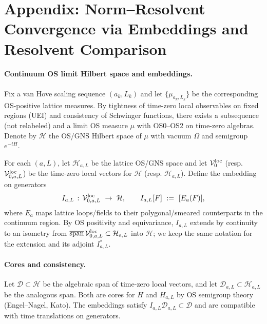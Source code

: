 \documentclass[11pt]{amsart}
\theoremstyle{plain}
\theoremstyle{definition}
\theoremstyle{remark}
\begin{document}
\medskip
\section{Appendix: Norm--Resolvent Convergence via Embeddings and Resolvent Comparison}

\paragraph{Continuum OS limit Hilbert space and embeddings.}
Fix a van Hove scaling sequence $(a_k,L_k)$ and let $\{\mu_{a_k,L_k}\}$ be the corresponding OS-positive lattice measures. By tightness of time-zero local observables on fixed regions (UEI) and consistency of Schwinger functions, there exists a subsequence (not relabeled) and a limit OS measure $\mu$ with OS0--OS2 on time-zero algebras. Denote by $\mathcal H$ the OS/GNS Hilbert space of $\mu$ with vacuum $\Omega$ and semigroup $e^{-tH}$.

For each $(a,L)$, let $\mathcal H_{a,L}$ be the lattice OS/GNS space and let $\mathcal V^{\rm loc}_0$ (resp. $\mathcal V^{\rm loc}_{0,a,L}$) be the time-zero local vectors for $\mathcal H$ (resp. $\mathcal H_{a,L}$). Define the embedding on generators
\[
  I_{a,L}\,:\, \mathcal V^{\rm loc}_{0,a,L}\ \to\ \mathcal H,
  \qquad I_{a,L}[F]\ :=\ [E_a(F)],
\]
where $E_a$ maps lattice loops/fields to their polygonal/smeared counterparts in the continuum region. By OS positivity and equivariance, $I_{a,L}$ extends by continuity to an isometry from $\overline{\mathrm{span}}\,\mathcal V^{\rm loc}_{0,a,L}\subset\mathcal H_{a,L}$ into $\mathcal H$; we keep the same notation for the extension and its adjoint $I_{a,L}^*$.

\paragraph{Cores and consistency.}
Let $\mathcal D\subset\mathcal H$ be the algebraic span of time-zero local vectors, and let $\mathcal D_{a,L}\subset \mathcal H_{a,L}$ be the analogous span. Both are cores for $H$ and $H_{a,L}$ by OS semigroup theory (Engel--Nagel, Kato). The embeddings satisfy $I_{a,L}\mathcal D_{a,L}\subset\mathcal D$ and are compatible with time translations on generators.
\end{document}
